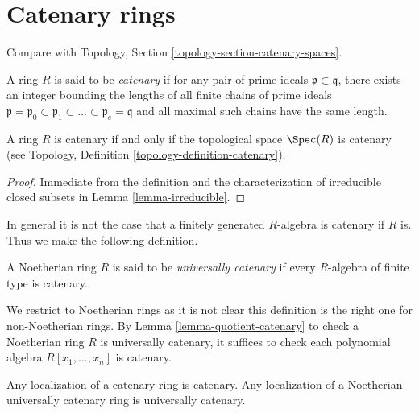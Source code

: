 \section{Catenary rings}
\label{section-catenary}

\noindent
Compare with Topology, Section \ref{topology-section-catenary-spaces}.

\begin{definition}
\label{definition-catenary}
A ring $R$ is said to be {\it catenary} if for any pair of prime ideals
$\mathfrak p \subset \mathfrak q$, there exists an integer bounding the
lengths of all finite chains of prime ideals
$\mathfrak p = \mathfrak p_0 \subset \mathfrak p_1 \subset \ldots \subset
\mathfrak p_e = \mathfrak q$ and all maximal such chains have the same length.
\end{definition}

\begin{lemma}
\label{lemma-catenary}
A ring $R$ is catenary if and only if the topological space
$\Spec(R)$ is catenary (see
Topology, Definition \ref{topology-definition-catenary}).
\end{lemma}

\begin{proof}
Immediate from the definition and the characterization of
irreducible closed subsets in Lemma \ref{lemma-irreducible}.
\end{proof}

\noindent
In general it is not the case that a finitely generated
$R$-algebra is catenary if $R$ is. Thus we make the following
definition.

\begin{definition}
\label{definition-universally-catenary}
A Noetherian ring $R$ is said to be {\it universally catenary}
if every $R$-algebra of finite type is catenary.
\end{definition}

\noindent
We restrict to Noetherian rings as it is not clear
this definition is the right one for non-Noetherian rings.
By Lemma \ref{lemma-quotient-catenary} to check a Noetherian
ring $R$ is universally catenary, it suffices to check
each polynomial algebra $R[x_1, \ldots, x_n]$ is catenary.

\begin{lemma}
\label{lemma-localization-catenary}
Any localization of a catenary ring is catenary.
Any localization of a Noetherian universally catenary
ring is universally catenary.
\end{lemma}

